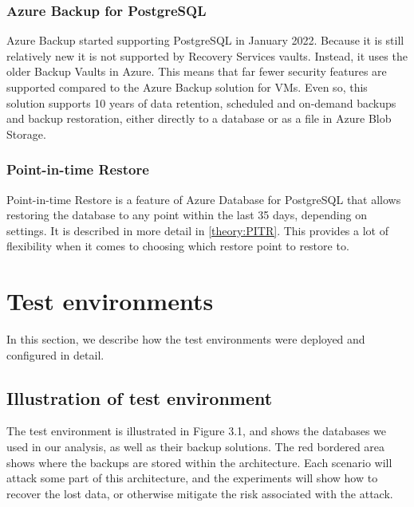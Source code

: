 \subsubsection{Azure Backup for PostgreSQL}
Azure Backup started supporting PostgreSQL in January 2022. Because it is still relatively new it is not supported by Recovery Services vaults. Instead, it uses the older Backup Vaults in Azure. This means that far fewer security features are supported compared to the Azure Backup solution for VMs. Even so, this solution supports 10 years of data retention, scheduled and on-demand backups and backup restoration, either directly to a database or as a file in Azure Blob Storage. 

\subsubsection{Point-in-time Restore}
Point-in-time Restore is a feature of Azure Database for PostgreSQL that allows restoring the database to any point within the last 35 days, depending on settings. It is described in more detail in \ref{theory:PITR}. This provides a lot of flexibility when it comes to choosing which restore point to restore to. 

\section{Test environments} \label{Deployments}

In this section, we describe how the test environments were deployed and configured in detail. 

\subsection{Illustration of test environment}
The test environment is illustrated in Figure 3.1, and shows the databases we used in our analysis, as well as their backup solutions. The red bordered area shows where the backups are stored within the architecture. Each scenario will attack some part of this architecture, and the experiments will show how to recover the lost data, or otherwise mitigate the risk associated with the attack. 

